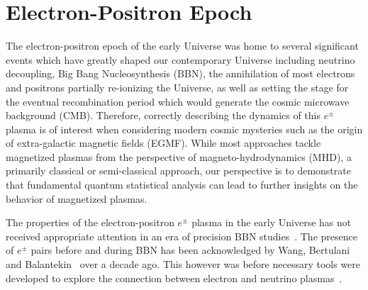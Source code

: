 \documentclass[universe,article,submit,moreauthors,pdftex,a4paper]{Definitions/mdpi}
\begin{document}



\section{Electron-Positron Epoch}\label{sec:ElectronPositron}
The electron-positron epoch of the early Universe was home to several significant events which have greatly shaped our contemporary Universe including neutrino decoupling, Big Bang Nucleosynthesis (BBN), the annihilation of most electrons and positrons partially re-ionizing the Universe, as well as setting the stage for the eventual recombination period which would generate the cosmic microwave background (CMB). Therefore, correctly describing the dynamics of this $e^{\pm}$ plasma is of interest when considering modern cosmic mysteries such as the origin of extra-galactic magnetic fields (EGMF). While most approaches tackle magnetized plasmas from the perspective of magneto-hydrodynamics (MHD), a primarily classical or semi-classical approach, our perspective is to demonstrate that fundamental quantum statistical analysis can lead to further insights on the behavior of magnetized plasmas.

The properties of the electron-positron $e^{\pm}$ plasma in the early Universe has not received appropriate attention in an era of precision BBN studies~\cite{Pitrou:2018cgg}. The presence of $e^{\pm}$ pairs before and during BBN has been acknowledged by Wang, Bertulani and Balantekin~\cite{Wang:2010px} over a decade ago. This however was before necessary tools were developed to explore the connection between electron and neutrino plasmas~\cite{Mangano:2005cc,Birrell:2012gg,Birrell:2014uka}. 
\end{document}
